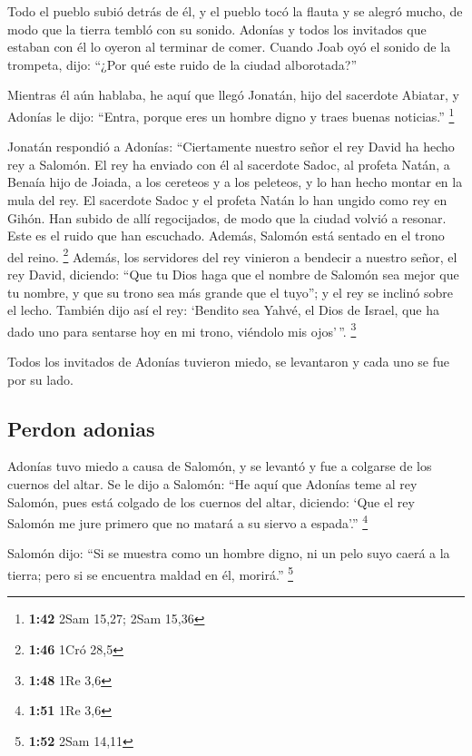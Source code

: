 \begin{paracol}{2}
 Todo el pueblo subió detrás de él, y el pueblo tocó la
flauta y se alegró mucho, de modo que la tierra tembló con su sonido.
 Adonías y todos los invitados que estaban con él lo
oyeron al terminar de comer. Cuando Joab oyó el sonido de la trompeta,
dijo: ``¿Por qué este ruido de la ciudad alborotada?''

 Mientras él aún hablaba, he aquí que llegó Jonatán, hijo
del sacerdote Abiatar, y Adonías le dijo: ``Entra, porque eres un hombre
digno y traes buenas noticias.'' \footnote{\textbf{1:42} 2Sam 15,27;
  2Sam 15,36}

 Jonatán respondió a Adonías: ``Ciertamente nuestro señor
el rey David ha hecho rey a Salomón.  El rey ha enviado
con él al sacerdote Sadoc, al profeta Natán, a Benaía hijo de Joiada, a
los cereteos y a los peleteos, y lo han hecho montar en la mula del rey.
 El sacerdote Sadoc y el profeta Natán lo han ungido como
rey en Gihón. Han subido de allí regocijados, de modo que la ciudad
volvió a resonar. Este es el ruido que han escuchado. 
Además, Salomón está sentado en el trono del reino. \footnote{\textbf{1:46}
  1Cró 28,5}  Además, los servidores del rey vinieron a
bendecir a nuestro señor, el rey David, diciendo: ``Que tu Dios haga que
el nombre de Salomón sea mejor que tu nombre, y que su trono sea más
grande que el tuyo''; y el rey se inclinó sobre el lecho.
 También dijo así el rey: `Bendito sea Yahvé, el Dios de
Israel, que ha dado uno para sentarse hoy en mi trono, viéndolo mis
ojos'\,''. \footnote{\textbf{1:48} 1Re 3,6}

 Todos los invitados de Adonías tuvieron miedo, se
levantaron y cada uno se fue por su lado.

\hypertarget{perdon-adonias}{%
\subsection{Perdon adonias}\label{perdon-adonias}}

 Adonías tuvo miedo a causa de Salomón, y se levantó y
fue a colgarse de los cuernos del altar.  Se le dijo a
Salomón: ``He aquí que Adonías teme al rey Salomón, pues está colgado de
los cuernos del altar, diciendo: `Que el rey Salomón me jure primero que
no matará a su siervo a espada'.'' \footnote{\textbf{1:51} 1Re 3,6}

 Salomón dijo: ``Si se muestra como un hombre digno, ni
un pelo suyo caerá a la tierra; pero si se encuentra maldad en él,
morirá.'' \footnote{\textbf{1:52} 2Sam 14,11}


\end{paracol}
